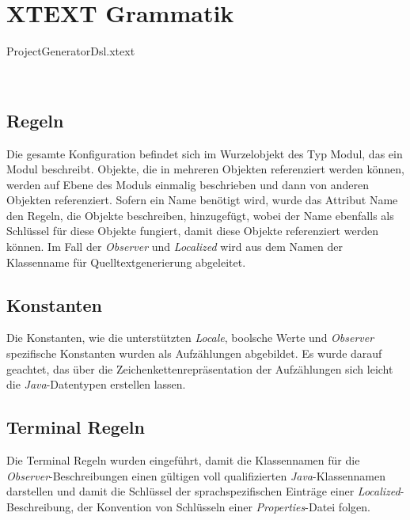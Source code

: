 \section{XTEXT Grammatik}
\begin{code}
	\caption{ProjectGeneratorDsl.xtext}
	\label{src:xtext-grammar}
\end{code}
\ \newline

\subsection{Regeln}
Die gesamte Konfiguration befindet sich im Wurzelobjekt des Typ Modul, das ein Modul beschreibt. Objekte, die in mehreren Objekten referenziert werden können, werden auf Ebene des Moduls einmalig beschrieben und dann von anderen Objekten referenziert. Sofern ein Name benötigt wird, wurde das Attribut Name den Regeln, die Objekte beschreiben, hinzugefügt, wobei der Name ebenfalls als Schlüssel für diese Objekte fungiert, damit diese Objekte referenziert werden können. Im Fall der \emph{Observer} und \emph{Localized} wird aus dem Namen der Klassenname für Quelltextgenerierung abgeleitet.
 
\subsection{Konstanten}
Die Konstanten, wie die unterstützten \emph{Locale}, boolsche Werte und \emph{Observer} spezifische Konstanten wurden als Aufzählungen abgebildet. Es wurde darauf geachtet, das über die Zeichenkettenrepräsentation der Aufzählungen sich leicht die \emph{Java}-Datentypen erstellen lassen.

\subsection{Terminal Regeln}
Die Terminal Regeln wurden eingeführt, damit die Klassennamen für die \emph{Observer}-Beschreibungen einen gültigen voll qualifizierten  \emph{Java}-Klassennamen darstellen und damit die Schlüssel der sprachspezifischen Einträge einer \emph{Localized}-Beschreibung, der Konvention von Schlüsseln einer \emph{Properties}-Datei folgen.